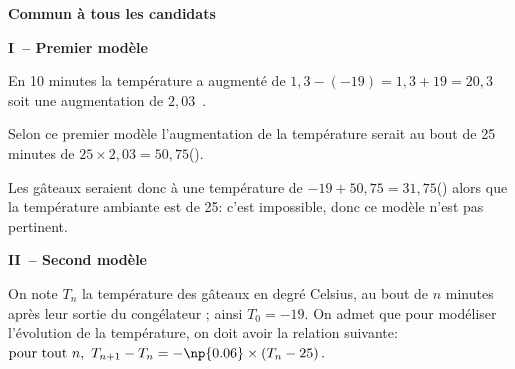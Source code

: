 \textbf{Commun à tous les candidats}








\begin{center}
\textbf{I~-- Premier modèle}
\end{center}




 

En 10 minutes la température a augmenté de $1,3 - ( - 19) = 1,3 + 19 = 20,3$ soit une augmentation de $2,03$~\textcelsius.

Selon ce premier modèle l'augmentation de la  température serait au bout de 25 minutes de $25 \times 2,03 = 50,75$(\textcelsius).

Les gâteaux seraient donc à une température de $- 19 + 50,75 = 31,75$(\textcelsius) alors que la température ambiante est de 25\textcelsius : c'est impossible, donc ce modèle n'est pas pertinent.

\begin{center}
\textbf{II~-- Second modèle}
\end{center}

On note $T_n$ la température des gâteaux  en degré Celsius, au bout de $n$ minutes après leur sortie du congélateur ; ainsi $T_0= - 19$.
  On admet que pour modéliser l'évolution de la température, on doit avoir la relation suivante:
 $\text{pour tout } n,\ T_{n+1}-T_n=-\np{0.06}\times \left(T_n - 25\right).$

